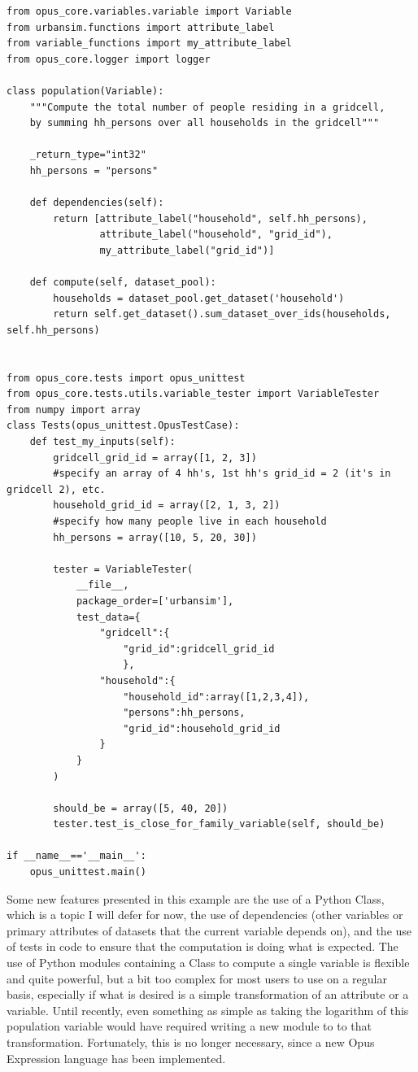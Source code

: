 \begin{lstlisting}
from opus_core.variables.variable import Variable
from urbansim.functions import attribute_label
from variable_functions import my_attribute_label
from opus_core.logger import logger

class population(Variable):
    """Compute the total number of people residing in a gridcell, 
    by summing hh_persons over all households in the gridcell"""
    
    _return_type="int32"
    hh_persons = "persons"

    def dependencies(self):
        return [attribute_label("household", self.hh_persons), 
                attribute_label("household", "grid_id"), 
                my_attribute_label("grid_id")]

    def compute(self, dataset_pool):
        households = dataset_pool.get_dataset('household')
        return self.get_dataset().sum_dataset_over_ids(households, self.hh_persons)


from opus_core.tests import opus_unittest
from opus_core.tests.utils.variable_tester import VariableTester
from numpy import array
class Tests(opus_unittest.OpusTestCase):
    def test_my_inputs(self):
        gridcell_grid_id = array([1, 2, 3])
        #specify an array of 4 hh's, 1st hh's grid_id = 2 (it's in gridcell 2), etc.
        household_grid_id = array([2, 1, 3, 2]) 
        #specify how many people live in each household
        hh_persons = array([10, 5, 20, 30])

        tester = VariableTester(
            __file__,
            package_order=['urbansim'],
            test_data={
                "gridcell":{
                    "grid_id":gridcell_grid_id 
                    }, 
                "household":{ 
                    "household_id":array([1,2,3,4]),
                    "persons":hh_persons, 
                    "grid_id":household_grid_id
                }
            }
        )
        
        should_be = array([5, 40, 20])
        tester.test_is_close_for_family_variable(self, should_be)

if __name__=='__main__':
    opus_unittest.main()
\end{lstlisting}

Some new features presented in this example are the use of a Python Class, which is a topic I will defer for now, the use of dependencies (other variables or primary attributes of datasets that the current variable depends on), and the use of tests in code to ensure that the computation is doing what is expected.  The use of Python modules containing a Class to compute a single variable is flexible and quite powerful, but a bit too complex for most users to use on a regular basis, especially if what is desired is a simple transformation of an attribute or a variable.  Until recently, even something as simple as taking the logarithm of this population variable would have required writing a new module to to that transformation.  Fortunately, this is no longer necessary, since a new Opus Expression language has been implemented.
